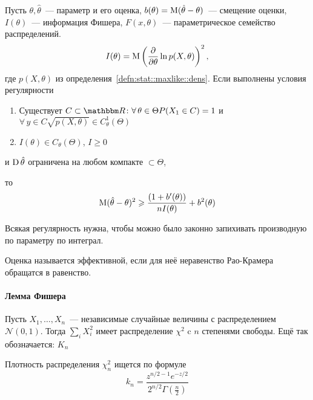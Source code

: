 \documentclass[12pt,timbord]{../../../notes}
\begin{document}
\begin{prop}\label{prop:stat::eff::rao}
  Пусть $\theta, \hat\theta$~--- параметр и его оценка, $b(\theta) = \operatorname{M} (\hat\theta -
  \theta)$~--- смещение оценки, $I(\theta)$~--- информация Фишера, $F(x,\theta)$~---
  параметрическое семейство распределений.
  \[
    I(\theta) = \operatorname{M} \left( \frac{\partial }{\partial \theta} \ln p(X, \theta)\right)^2,
  \]
  где $p(X,\theta)$ из определения~\ref{defn:stat::maxlike::dens}. Если выполнены условия
  регулярности
  \begin{enumerate}
    \item Существует $C\subset\R \colon \forall\, \theta\in \Theta P(X_1 \in C) =1 $ и $\forall\,
      y \in C \sqrt{p(X, \theta)} \in C^1_\theta (\Theta)$
    \item $I(\theta) \in C_\theta(\Theta)$, $I \geqslant 0$
  \end{enumerate}
  и $\operatorname{D} \hat \theta $ ограничена на любом компакте $\subset \Theta$, 
  
  то
  \[
    \operatorname{M} (\hat\theta - \theta)^2 \geqslant \frac{(1+b'(\theta))}{n I(\theta)} + b^2(\theta) 
  \]
\end{prop}
\begin{rem}\label{rem:stat::eff::reg}
  Всякая регулярность нужна, чтобы можно было законно запихивать производную по параметру по
  интеграл. 
\end{rem}

\begin{defn}\label{defn:stat::eff::eff}
  Оценка называется эффективной, если для неё неравенство Рао-Крамера обращатся в равенство.
\end{defn}

\paragraph{Лемма Фишера}
\label{par:stat::fishlem}

\begin{defn}\label{defn:stat::fishlem::chi}
  Пусть $X_1, \dotsc, X_n$~--- независимые случайные величины с распределением $\mathcal N(0,1)$.
  Тогда $\sum_i X_i^2$ имеет распределение $\chi^2$ c $n$ степенями свободы. Ещё так обозначается:
  $K_n$
\end{defn}
\begin{prop}\label{prop:stat::fishlem::chidens}
  Плотность распределения $\chi^2_n$ ищется по формуле \[\displaystyle k_n = \frac{z^{n/2-1}
  e^{-z/2}}{2^{n/2} \Gamma \left(\frac{n}{2} \right)} \]
\end{prop}
\end{document}
